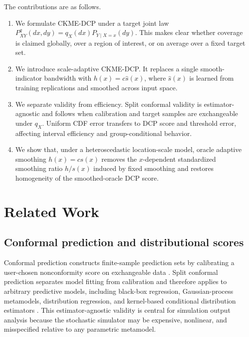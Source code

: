 \documentclass[11pt]{article}
\newif\ifincludeexperiments
\begin{document}
The contributions are as follows.
\begin{enumerate}[leftmargin=1.7em]
  \item We formulate CKME-DCP under a target joint law \(P^q_{XY}(dx,dy)=q_X(dx)P_{Y\mid X=x}(dy)\). This makes clear whether coverage is claimed globally, over a region of interest, or on average over a fixed target set.
  \item We introduce scale-adaptive CKME-DCP. It replaces a single smooth-indicator bandwidth with \(h(x)=c\widehat s(x)\), where \(\widehat s(x)\) is learned from training replications and smoothed across input space.
  \item We separate validity from efficiency. Split conformal validity is estimator-agnostic and follows when calibration and target samples are exchangeable under \(q_X\). Uniform CDF error transfers to DCP score and threshold error, affecting interval efficiency and group-conditional behavior.
  \item We show that, under a heteroscedastic location-scale model, oracle adaptive smoothing \(h(x)=c s(x)\) removes the \(x\)-dependent standardized smoothing ratio \(h/s(x)\) induced by fixed smoothing and restores homogeneity of the smoothed-oracle DCP score.
  \ifincludeexperiments
  \item We report numerical evidence from the current simulation suite. Oracle adaptive smoothing improves worst-bin coverage deviation and paired interval score on all considered data-generating processes.
  \fi
\end{enumerate}

\section{Related Work}
\label{sec:related}

\subsection{Conformal prediction and distributional scores}

Conformal prediction constructs finite-sample prediction sets by calibrating a user-chosen nonconformity score on exchangeable data \cite{vovk2005,shafer2008}. Split conformal prediction separates model fitting from calibration and therefore applies to arbitrary predictive models, including black-box regression, Gaussian-process metamodels, distribution regression, and kernel-based conditional distribution estimators \cite{lei2018,angelopoulos2023}. This estimator-agnostic validity is central for simulation output analysis because the stochastic simulator may be expensive, nonlinear, and misspecified relative to any parametric metamodel.
\end{document}
